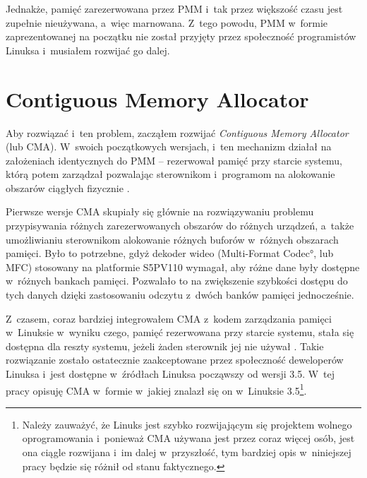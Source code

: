 Jednakże, pamięć zarezerwowana przez PMM i~tak przez większość czasu
jest zupełnie nieużywana, a~więc marnowana.  Z~tego powodu, PMM
w~formie zaprezentowanej na początku nie został przyjęty przez
społeczność programistów Linuksa i~musiałem rozwijać go dalej.

\section{Contiguous Memory Allocator}

Aby rozwiązać i~ten problem, zacząłem rozwijać {\it Contiguous Memory
  Allocator} (lub CMA).  W~swoich początkowych wersjach, i~ten
mechanizm działał na założeniach identycznych do PMM -- rezerwował
pamięć przy starcie systemu, którą potem zarządzał pozwalając
sterownikom i~programom na alokowanie obszarów ciągłych fizycznie
\cite{patch:cma-4}.

Pierwsze wersje CMA skupiały się głównie na rozwiązywaniu problemu
przypisywania różnych zarezerwowanych obszarów do różnych urządzeń,
a~także umożliwianiu sterownikom alokowanie różnych buforów w~różnych
obszarach pamięci.  Było to potrzebne, gdyż dekoder wideo
(\ang{Multi-Format Codec}, lub MFC) stosowany na platformie S5PV110
wymagał, aby różne dane były dostępne w~różnych bankach pamięci.
Pozwalało to na zwiększenie szybkości dostępu do tych danych dzięki
zastosowaniu odczytu z~dwóch banków pamięci jednocześnie.

Z~czasem, coraz bardziej integrowałem CMA z~kodem zarządzania pamięci
w~Linuksie w~wyniku czego, pamięć rezerwowana przy starcie systemu,
stała się dostępna dla reszty systemu, jeżeli żaden sterownik jej nie
używał \cite{patch:cma-24}.  Takie rozwiązanie zostało ostatecznie
zaakceptowane przez społeczność deweloperów Linuksa i~jest dostępne
w~źródłach Linuksa począwszy od wersji 3.5.  W~tej pracy opisuję CMA
w~formie w~jakiej znalazł się on w~Linuksie 3.5\footnote{Należy
  zauważyć, że Linuks jest szybko rozwijającym się projektem wolnego
  oprogramowania i~ponieważ CMA używana jest przez coraz więcej osób,
  jest ona ciągle rozwijana i~im dalej w~przyszłość, tym bardziej opis
  w~niniejszej pracy będzie się różnił od stanu faktycznego.}.
